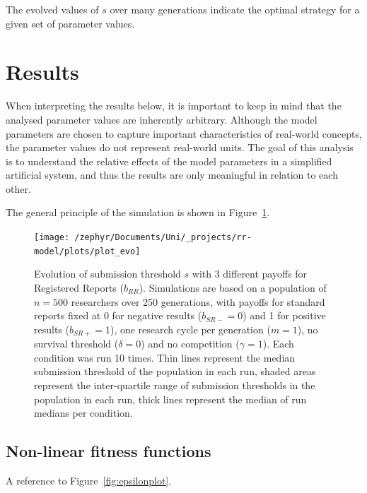 \documentclass[british,,man,floatsintext]{apa6}
\begin{document}
The evolved values of \(s\) over many generations indicate the optimal strategy for a given set of parameter values.

\hypertarget{results}{%
\section{Results}\label{results}}

When interpreting the results below, it is important to keep in mind that the analysed parameter values are inherently arbitrary.
Although the model parameters are chosen to capture important characteristics of real-world concepts, the parameter values do not represent real-world units.
The goal of this analysis is to understand the relative effects of the model parameters in a simplified artificial system, and thus the results are only meaningful in relation to each other.

The general principle of the simulation is shown in Figure~\ref{fig:evoplot}.



\begin{figure}

{\centering \texttt{[image: /zephyr/Documents/Uni/\_projects/rr-model/plots/plot\_evo]} 

}

\caption{Evolution of submission threshold \(s\) with 3 different payoffs for Registered Reports (\(b_{RR}\)). Simulations are based on a population of \(n = 500\) researchers over 250 generations, with payoffs for standard reports fixed at 0 for negative results (\(b_{SR-} = 0\)) and 1 for positive results (\(b_{SR+} = 1\)), one research cycle per generation (\(m = 1\)), no survival threshold (\(\delta = 0\)) and no competition (\(\gamma = 1\)). Each condition was run 10 times. Thin lines represent the median submission threshold of the population in each run, shaded areas represent the inter-quartile range of submission thresholds in the population in each run, thick lines represent the median of run medians per condition.}\label{fig:evoplot}
\end{figure}

\hypertarget{non-linear-fitness-functions-1}{%
\subsection{Non-linear fitness functions}\label{non-linear-fitness-functions-1}}

A reference to Figure~\ref{fig:epsilonplot}.
\end{document}
